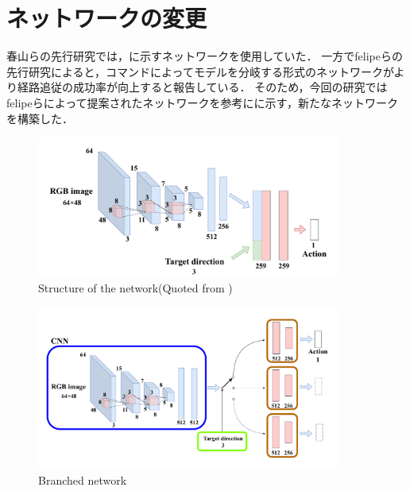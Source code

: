 \section{ネットワークの変更}
春山らの先行研究では，に示すネットワークを使用していた．
一方でfelipeらの先行研究によると，コマンドによってモデルを分岐する形式のネットワークがより経路追従の成功率が向上すると報告している．
そのため，今回の研究ではfelipeらによって提案されたネットワークを参考にに示す，新たなネットワークを構築した．

\begin{figure}[htbp]
  \centering
  \includegraphics[width=100mm]{images/pdf/haruyama/net.pdf}
  \caption{Structure of the network(Quoted from \cite{fujiwara2023})}
  \label{fig:haruyama_net}
\end{figure}

\begin{figure}[htbp]
  \centering
   \includegraphics[width=100mm]{images/pdf/ishiguro/branched.pdf}
   \caption{Branched network}
   \label{fig:branched}
\end{figure}